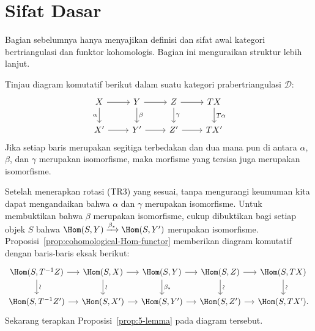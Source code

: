 
\section{Sifat Dasar}\label{sec:triangular-basic}
\hypertarget{o014.aljabr2.chapter4.triangulated-basics}{ }

Bagian sebelumnya hanya menyajikan definisi dan sifat awal kategori
bertriangulasi dan funktor kohomologis. Bagian ini menguraikan struktur lebih
lanjut.

\begin{proposisi}\label{prop:dt-3-2}
	Tinjau diagram komutatif berikut dalam suatu kategori prabertriangulasi
	$\mathcal{D}$:
	\[\begin{tikzcd}
		X \arrow[r] \arrow[d, "\alpha"'] & Y \arrow[d, "\beta"] \arrow[r] & Z \arrow[d, "\gamma"] \arrow[r] & TX \arrow[d, "T\alpha"] \\
		X' \arrow[r] & Y' \arrow[r] & Z' \arrow[r] & TX'
	\end{tikzcd}\]
	Jika setiap baris merupakan segitiga terbedakan dan dua mana pun di antara
	$\alpha$, $\beta$, dan $\gamma$ merupakan isomorfisme, maka morfisme yang
	tersisa juga merupakan isomorfisme.
\end{proposisi}

\begin{bukti}
	Setelah menerapkan rotasi (TR3) yang sesuai, tanpa mengurangi keumuman kita
	dapat mengandaikan bahwa $\alpha$ dan $\gamma$ merupakan isomorfisme. Untuk
	membuktikan bahwa $\beta$ merupakan isomorfisme, cukup dibuktikan bagi setiap
	objek $S$ bahwa
	$\Hom(S, Y) \xrightarrow{\beta_*} \Hom(S, Y')$ merupakan isomorfisme.
	Proposisi~\ref{prop:cohomological-Hom-functor} memberikan diagram komutatif
	dengan baris-baris eksak berikut:
	\[\begin{tikzcd}[column sep=small]
		\Hom(S, T^{-1} Z) \arrow[d, "\sim" sloped] \arrow[r] & \Hom(S, X) \arrow[r] \arrow[d, "\sim" sloped] & \Hom(S,Y) \arrow[d, "{\beta_*}"] \arrow[r] & \Hom(S,Z) \arrow[d, "\sim" sloped] \arrow[r] & \Hom(S, TX) \arrow[d, "\sim" sloped] \\
		\Hom(S, T^{-1} Z') \arrow[r] & \Hom(S, X') \arrow[r] & \Hom(S, Y') \arrow[r] & \Hom(S, Z') \arrow[r] & \Hom(S, TX') .
	\end{tikzcd}\]
	Sekarang terapkan Proposisi~\ref{prop:5-lemma} pada diagram tersebut.
\end{bukti}

